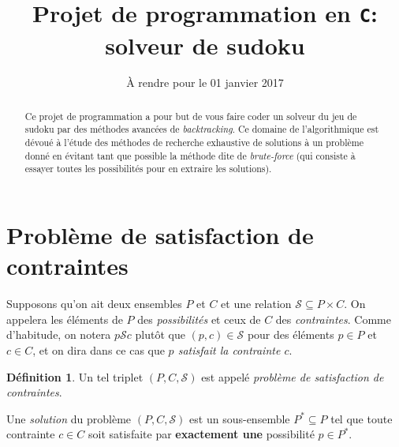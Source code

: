 \documentclass[french,a4paper]{article}
\title{Projet de programmation en {\tt C}:\\
  solveur de sudoku}
\date{\`A rendre pour le 01 janvier 2017}
\author{}
\theoremstyle{definition}
\newtheorem*{definition}{Définition}
\theoremstyle{remark}
\begin{document}
\begin{abstract}
  Ce projet de programmation a pour but de vous faire coder un solveur
  du jeu de sudoku par des méthodes avancées de {\em backtracking}. Ce
  domaine de l'algorithmique est dévoué à l'étude des méthodes de
  recherche exhaustive de solutions à un problème donné en évitant
  tant que possible la méthode dite de {\em brute-force} (qui consiste
  à essayer toutes les possibilités pour en extraire les solutions).
\end{abstract}

\maketitle

\section{Problème de satisfaction de contraintes}
\label{sec:exact-hit}

Supposons qu'on ait deux ensembles $P$ et $C$ et une relation
$\mathcal S \subseteq P \times C$. On appelera les éléments de $P$ des
{\em possibilités} et ceux de $C$ des {\em contraintes}. Comme
d'habitude, on notera $p \mathrel{\mathcal S} c$ plutôt que
$(p,c) \in \mathcal S$ pour des éléments $p\in P$ et $c\in C$, et on
dira dans ce cas que {\em $p$ satisfait la contrainte $c$}.

\begin{definition}
  Un tel triplet $(P,C,\mathcal S)$ est appelé {\em problème de
    satisfaction de contraintes}.

  Une {\em solution} du problème $(P,C,\mathcal S)$ est un
  sous-ensemble $P^\ast \subseteq P$ tel que toute contrainte
  $c \in C$ soit satisfaite par {\bf exactement une} possibilité
  $p \in P^\ast$.
\end{definition}
\end{document}
